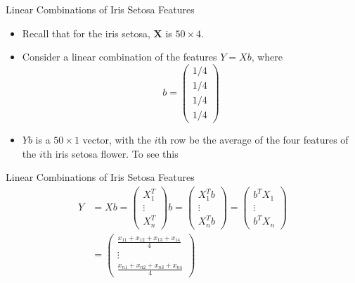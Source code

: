 \documentclass[
  ignorenonframetext,
]{beamer}
\providecommand{\tightlist}{%
  \setlength{\itemsep}{0pt}\setlength{\parskip}{0pt}}
\begin{document}
\begin{frame}{Linear Combinations of Iris Setosa Features}
\protect\hypertarget{linear-combinations-of-iris-setosa-features}{}
\begin{itemize}
\tightlist
\item
  Recall that for the iris setosa, \(\mathbf X\) is \(50\times 4\).
\item
  Consider a linear combination of the features \(Y= Xb\), where \[
  b=\begin{pmatrix}
  1/4 \\ 1/4 \\ 1/4 \\ 1/4
  \end{pmatrix}\]
\item
  \(Yb\) is a \(50\times 1\) vector, with the \(i\)th row be the average
  of the four features of the \(i\)th iris setosa flower. To see this
\end{itemize}
\end{frame}

\begin{frame}{Linear Combinations of Iris Setosa Features}
\protect\hypertarget{linear-combinations-of-iris-setosa-features-1}{}
\[\begin{aligned}
Y&=Xb=
\begin{pmatrix} X_1^T \\ \vdots \\ X_n^T  \end{pmatrix} b
 =
\begin{pmatrix} X_1^Tb \\ \vdots \\ X_n^Tb  \end{pmatrix}
=\begin{pmatrix} b^TX_1 \\ \vdots \\ b^TX_n  \end{pmatrix}\\
&=\begin{pmatrix} \frac{x_{11} +x_{12} + x_{13} + x_{14}}{4}  \\ 
\vdots \\ 
 \frac{x_{n1} +x_{n2} + x_{n3} + x_{n4}}{4}   \end{pmatrix}
\end{aligned}
\]
\end{frame}
\end{document}
